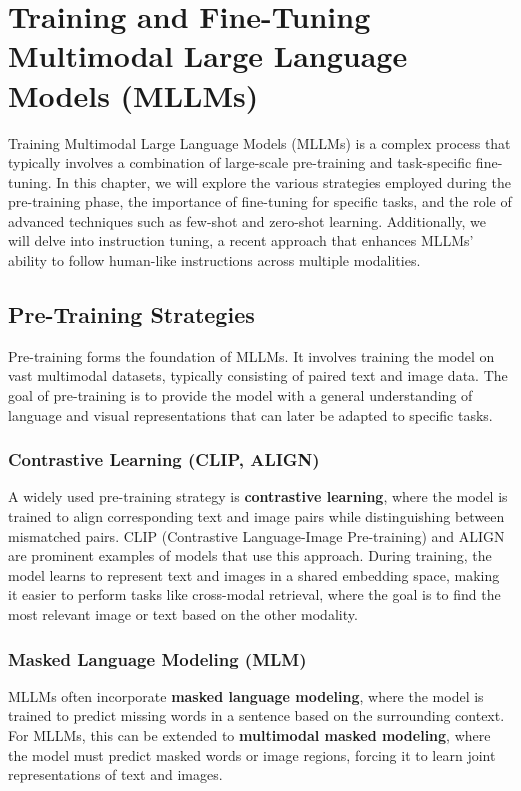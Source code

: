 \chapter{Training and Fine-Tuning Multimodal Large Language Models (MLLMs)}

Training Multimodal Large Language Models (MLLMs) is a complex process that typically involves a combination of large-scale pre-training and task-specific fine-tuning. In this chapter, we will explore the various strategies employed during the pre-training phase, the importance of fine-tuning for specific tasks, and the role of advanced techniques such as few-shot and zero-shot learning. Additionally, we will delve into instruction tuning, a recent approach that enhances MLLMs' ability to follow human-like instructions across multiple modalities.

\section{Pre-Training Strategies}

Pre-training forms the foundation of MLLMs. It involves training the model on vast multimodal datasets, typically consisting of paired text and image data. The goal of pre-training is to provide the model with a general understanding of language and visual representations that can later be adapted to specific tasks.

\subsection{Contrastive Learning (CLIP, ALIGN)}

A widely used pre-training strategy is \textbf{contrastive learning}, where the model is trained to align corresponding text and image pairs while distinguishing between mismatched pairs. CLIP (Contrastive Language-Image Pre-training) and ALIGN are prominent examples of models that use this approach. During training, the model learns to represent text and images in a shared embedding space, making it easier to perform tasks like cross-modal retrieval, where the goal is to find the most relevant image or text based on the other modality.

\subsection{Masked Language Modeling (MLM)}

MLLMs often incorporate \textbf{masked language modeling}, where the model is trained to predict missing words in a sentence based on the surrounding context. For MLLMs, this can be extended to \textbf{multimodal masked modeling}, where the model must predict masked words or image regions, forcing it to learn joint representations of text and images.

